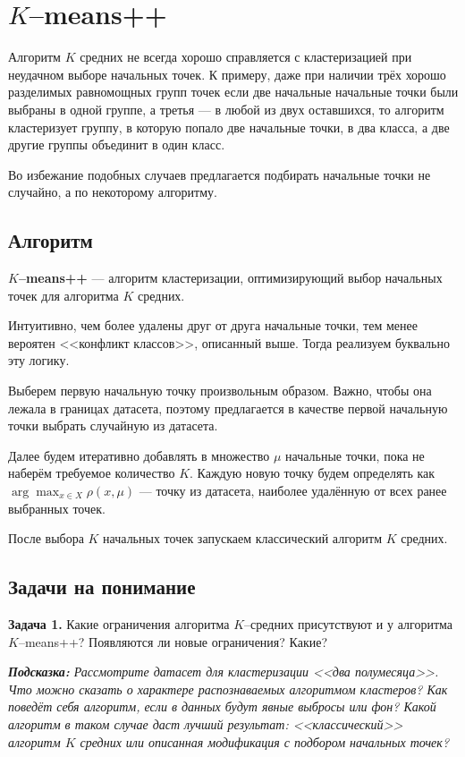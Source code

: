 \section{$K$--means++}

Алгоритм $K$ средних не всегда хорошо справляется с кластеризацией при неудачном выборе начальных точек.
К примеру, даже при наличии трёх хорошо разделимых равномощных групп точек если две начальные начальные точки были выбраны в одной группе,
а третья --- в любой из двух оставшихся, то алгоритм кластеризует группу, в которую попало две начальные точки, в два класса, а две другие группы объединит в один класс.

Во избежание подобных случаев предлагается подбирать начальные точки не случайно, а по некоторому алгоритму.

\subsection{Алгоритм}

\textbf{$K$--means++} --- алгоритм кластеризации, оптимизирующий выбор начальных точек для алгоритма $K$ средних.

Интуитивно, чем более удалены друг от друга начальные точки, тем менее вероятен <<конфликт классов>>, описанный выше. Тогда реализуем буквально эту логику.

Выберем первую начальную точку произвольным образом. Важно, чтобы она лежала в границах датасета, поэтому предлагается
в качестве первой начальную точки выбрать случайную из датасета.

Далее будем итеративно добавлять в множество $\mu$ начальные точки, пока не наберём требуемое количество $K$.
Каждую новую точку будем определять как $\arg\max_{x\in X} \rho(x, \mu)$ --- точку из датасета, наиболее удалённую от всех ранее выбранных точек.

После выбора $K$ начальных точек запускаем классический алгоритм $K$ средних.

\subsection{Задачи на понимание}

\textbf{Задача 1.} Какие ограничения алгоритма $K$--средних присутствуют и у алгоритма $K$--means++? Появляются ли новые ограничения? Какие?

\textit{\textbf{Подсказка:} Рассмотрите датасет для кластеризации <<два полумесяца>>.
    Что можно сказать о характере распознаваемых алгоритмом кластеров?
    Как поведёт себя алгоритм, если в данных будут явные выбросы или фон?
    Какой алгоритм в таком случае даст лучший результат: <<классический>> алгоритм $K$ средних или описанная модификация с подбором начальных точек?}

